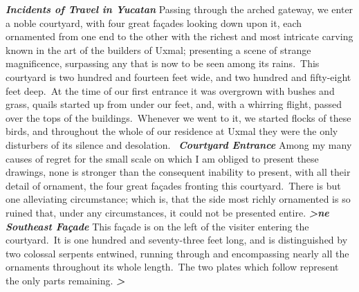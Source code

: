 \smallbreak
\noindent \textbf{\large{\emph{Incidents of Travel in Yucatan}}}
\smallbreak
\noindent Passing through the arched gateway, we enter a noble courtyard, with four great façades looking down upon it, each ornamented from one end to the other with the richest and most intricate carving known in the art of the builders of Uxmal; presenting a scene of strange magnificence, surpassing any that is now to be seen among its rains. This courtyard is two hundred and fourteen feet wide, and two hundred and fifty-eight feet deep. At the time of our first entrance it was overgrown with bushes and grass, quails started up from under our feet, and, with a whirring flight, passed over the tops of the buildings. Whenever we went to it, we started flocks of these birds, and throughout the whole of our residence at Uxmal they were the only disturbers of its silence and desolation. 
\smallbreak
\noindent \textbf{\emph{Courtyard Entrance}}
\smallbreak
\noindent Among my many causes of regret for the small scale on which I am obliged to present these drawings, none is stronger than the consequent inability to present, with all their detail of ornament, the four great façades fronting this courtyard. There is but one alleviating circumstance; which is, that the side most richly ornamented is so ruined that, under any circumstances, it could not be presented entire.
\smallbreak
\noindent \textbf{\emph{>﻿ne}}
\smallbreak
\noindent \textbf{\emph{Southeast Façade}}
\smallbreak
\noindent This façade is on the left of the visiter entering the courtyard. It is one hundred and seventy-three feet long, and is distinguished by two colossal serpents entwined, running through and encompassing nearly all the ornaments throughout its whole length. The two plates which follow represent the only parts remaining.
\smallbreak
\noindent \textbf{\emph{>﻿}}
